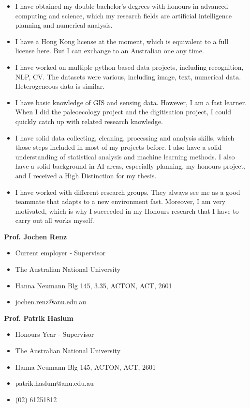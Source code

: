 \documentclass[11pt, a4paper]{awesome-cv}
\begin{document}
\begin{cvletter}
\begin{itemize}
	\item I have obtained my double bachelor's degrees with honours in advanced computing and science, which my research fields are artificial intelligence planning and numerical analysis.
	\item I have a Hong Kong license at the moment, which is equivalent to a full license here. But I can exchange to an Australian one any time.
	\item I have worked on multiple python based data projects, including recognition, NLP, CV. The datasets were various, including image, text, numerical data. Heterogeneous data is similar.
	\item I have basic knowledge of GIS and sensing data. However, I am a fast learner. When I did the paleoecology project and the digitisation project, I could quickly catch up with related research knowledge.
	\item I have solid data collecting, cleaning, processing and analysis skills, which those steps included in most of my projects before. I also have a solid understanding of statistical analysis and machine learning methods. I also have a solid background in AI areas, especially planning, my honours project, and I received a High Distinction for my thesis.
	\item I have worked with different research groups. They always see me as a good teammate that adapts to a new environment fast. Moreover, I am very motivated, which is why I succeeded in my Honours research that I have to carry out all works myself. 
\end{itemize}




\textbf{Prof. Jochen Renz}
\begin{itemize}
	\item Current employer ‑ Supervisor
	\item The Australian National University
	\item Hanna Neumann Blg 145, 3.35, ACTON, ACT, 2601
	\item jochen.renz@anu.edu.au
\end{itemize}

\textbf{Prof. Patrik Haslum}
\begin{itemize}
	\item Honours Year ‑ Supervisor
	\item The Australian National University
	\item Hanna Neumann Blg 145, ACTON, ACT, 2601
	\item patrik.haslum@anu.edu.au
	\item (02) 61251812
\end{itemize}


\end{cvletter}
\end{document}
